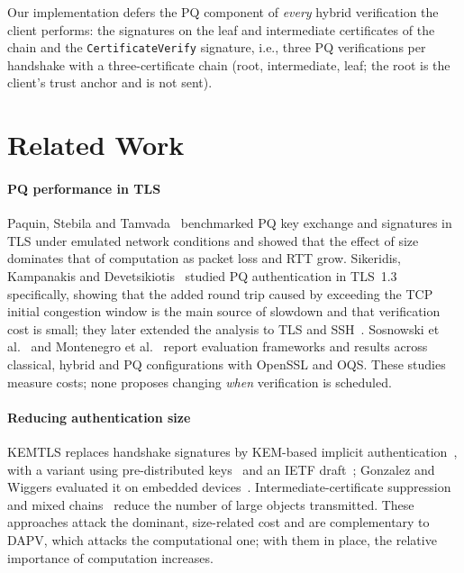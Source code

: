 \documentclass[preprint,10pt,3p]{elsarticle}
\begin{document}
Our implementation defers the PQ component of \emph{every} hybrid
verification the client performs: the signatures on the leaf and
intermediate certificates of the chain and the \texttt{CertificateVerify}
signature, i.e., three PQ verifications per handshake with a
three-certificate chain (root, intermediate, leaf; the root is the client's
trust anchor and is not sent).

\section{Related Work}
\label{sec:related}

\paragraph{PQ performance in TLS}  Paquin, Stebila and
Tamvada~\cite{Paquin2020} benchmarked PQ key exchange and signatures in TLS
under emulated network conditions and showed that the effect of size
dominates that of computation as packet loss and RTT grow.  Sikeridis,
Kampanakis and Devetsikiotis~\cite{Sikeridis2020a} studied PQ
authentication in TLS~1.3 specifically, showing that the added round trip
caused by exceeding the TCP initial congestion window is the main source of
slowdown and that verification cost is small; they later extended the
analysis to TLS and SSH~\cite{Sikeridis2020b}.  Sosnowski et
al.~\cite{Sosnowski2023} and Montenegro et al.~\cite{Montenegro2026}
report evaluation frameworks and results across classical, hybrid and PQ
configurations with OpenSSL and OQS.  These studies measure costs; none
proposes changing \emph{when} verification is scheduled.

\paragraph{Reducing authentication size}  KEMTLS replaces handshake
signatures by KEM-based implicit authentication~\cite{Schwabe2020KEMTLS},
with a variant using pre-distributed keys~\cite{Schwabe2021} and an IETF
draft~\cite{WiggersIETF2024}; Gonzalez and Wiggers evaluated it on embedded
devices~\cite{Gonzalez2022}.  Intermediate-certificate
suppression~\cite{KampanakisKallitsis2022,Sikeridis2022ICA} and mixed
chains~\cite{Paul2022} reduce the number of large objects transmitted.
These approaches attack the dominant, size-related cost and are
complementary to DAPV, which attacks the computational one; with them in
place, the relative importance of computation increases.
\end{document}

